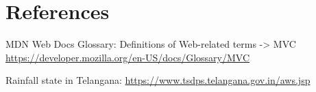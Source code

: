 \documentclass[table, 12pt]{article}
\begin{document}
\section{References}


\begin{thebibliography}{9}
    MDN Web Docs Glossary: Definitions of Web-related terms -> MVC
    \url{https://developer.mozilla.org/en-US/docs/Glossary/MVC}

    Rainfall state in Telangana: \url{https://www.tsdps.telangana.gov.in/aws.jsp}
    
\end{thebibliography}
\end{document}
